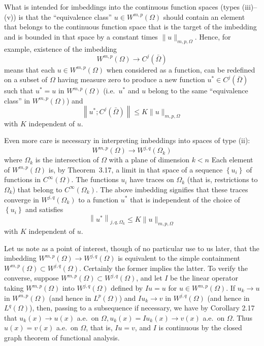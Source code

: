 \begin{para}
  What is intended for imbeddings into the continuous function spaces (types (iii)--(v)) is that 
  the ``equivalence class'' $u \in W^{m, p}(\Omega)$ should contain an element that belongs to the 
  continuous function space that is the target of the imbedding and is bounded in that space by a 
  constant times $\|u\|_{m,p,\Omega}$. Hence, for example, existence of the imbedding
  \[
  W^{m, p}(\Omega) \rightarrow C^j(\bar{\Omega})
  \]
  means that each $u \in W^{m, p}(\Omega)$ when considered as a function,
  can be redefined on a subset of $\Omega$ having measure zero to produce
  a new function $u^* \in C^j(\bar{\Omega})$ such that $u^*=u$ in $W^{m, p}(\Omega)$
  (i.e.~$u^*$ and $u$ belong to the same ``equivalence class'' in $W^{m, p}(\Omega)$) and
  \[
  \left\|u^* ; C^j(\bar{\Omega})\right\| \leq K\|u\|_{m, p, \Omega}
  \]
  with $K$ independent of $u$.
  
  Even more care is necessary in interpreting imbeddings into spaces of type (ii):
  \[
  W^{m, p}(\Omega) \rightarrow W^{j, q}\left(\Omega_k\right)
  \]
  where $\Omega_k$ is the intersection of $\Omega$ with a plane of dimension $k<n$
  Each element of $W^{m, p}(\Omega)$ is, by Theorem~3.17, a limit in that space of a sequence 
  $\left\{u_i\right\}$ of functions in $C^{\infty}(\Omega)$.
  The functions $u_i$ have traces on $\Omega_k$ (that is, restrictions to $\Omega_k$) that belong 
  to $C^{\infty}\left(\Omega_k\right)$. The above imbedding signifies that these traces converge 
  in $W^{j, q}\left(\Omega_k\right)$ to a function $u^*$ that is independent of the choice of 
  $\left\{u_i\right\}$ and satisfies
  \[
  \left\|u^*\right\|_{j, q, \Omega_k} \leq K\|u\|_{m, p, \Omega}
  \]
  with $K$ independent of $u$.
\end{para}


\begin{para}
  Let us note as a point of interest, though of no particular use to us later,
  that the imbedding $W^{m, p}(\Omega) \rightarrow W^{j,q}(\Omega)$ is equivalent to the simple 
  containment $W^{m, p}(\Omega) \subset W^{j, q}(\Omega)$. Certainly the former implies the 
  latter. To verify the converse, suppose $W^{m, p}(\Omega) \subset W^{j,q}(\Omega)$, and let $I$ 
  be the linear operator taking $W^{m, p}(\Omega)$ into $W^{j, q}(\Omega)$ defined by $I u=u$ for 
  $u \in W^{m, p}(\Omega)$. If $u_k \rightarrow u$ in $W^{m, p}(\Omega)$
  (and hence in $L^p(\Omega)$) and $I u_k \rightarrow v$ in $W^{j,q}(\Omega)$
  (and hence in $L^q(\Omega)$), then, passing to a subsequence if necessary,
  we have by Corollary 2.17 that
  $u_k(x) \rightarrow u(x)$ a.e.~on $\Omega, u_k(x)=I u_k(x) \rightarrow v(x)$ a.e.~on $\Omega$. 
  Thus $u(x)=v(x)$ a.e.~on $\Omega$, that is, $I u=v$, and $I$ is continuous by the closed graph 
  theorem of functional analysis.
\end{para}


